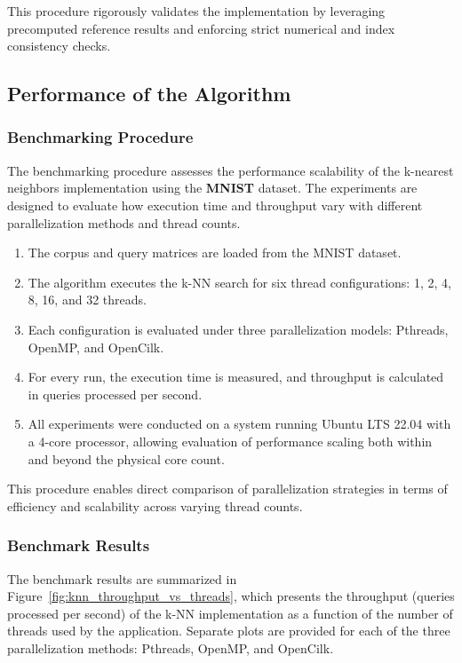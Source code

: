 \documentclass{article}
\begin{document}
This procedure rigorously validates the implementation by leveraging precomputed reference results and 
enforcing strict numerical and index consistency checks.

\subsection{Performance of the Algorithm}

\subsubsection{Benchmarking Procedure}

The benchmarking procedure assesses the performance scalability of the k-nearest neighbors implementation 
using the \textbf{MNIST} dataset. The experiments are designed to evaluate how execution time and throughput 
vary with different parallelization methods and thread counts.

\begin{enumerate}
    \item The corpus and query matrices are loaded from the MNIST dataset.
    \item The algorithm executes the k-NN search for six thread configurations: 
    1, 2, 4, 8, 16, and 32 threads.
    \item Each configuration is evaluated under three parallelization models: Pthreads, OpenMP, and OpenCilk.
    \item For every run, the execution time is measured, and throughput is calculated in queries processed 
    per second.
    \item All experiments were conducted on a system running Ubuntu LTS 22.04 with a 4-core processor, 
    allowing evaluation of performance scaling both within and beyond the physical core count.
\end{enumerate}

This procedure enables direct comparison of parallelization strategies in terms of efficiency and scalability
across varying thread counts.

\subsubsection{Benchmark Results}

The benchmark results are summarized in Figure~\ref{fig:knn_throughput_vs_threads}, which presents the 
throughput (queries processed per second) of the k-NN implementation as a function of the number of 
threads used by the application. Separate plots are provided for each of the three parallelization methods: 
Pthreads, OpenMP, and OpenCilk.
\end{document}
